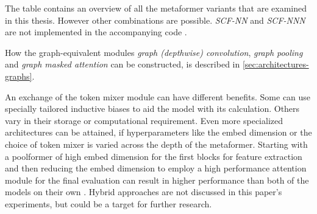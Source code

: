 The table contains an overview of all the metaformer variants that are examined in this thesis.
However other combinations are possible. \emph{SCF-NN} and \emph{SCF-NNN} are not implemented in the accompanying code \cite{selfPhysics}\cite{selfComputerScience}.

How the graph-equivalent modules \emph{graph (depthwise) convolution}, \emph{graph pooling} and \emph{graph masked attention} can be constructed, is described in \autoref{sec:architectures-graphs}.

An exchange of the token mixer module can have different benefits. 
Some can use specially tailored inductive biases to aid the model with its calculation.
Others vary in their storage or computational requirement.
Even more specialized architectures can be attained, if hyperparameters like the embed dimension or the choice of token mixer is varied across the depth of the metaformer. 
Starting with a poolformer of high embed dimension for the first blocks for feature extraction and then reducing the embed dimension to employ a high performance attention module for the final evaluation can result in higher performance than both of the models on their own \cite{metaformerPaper}. 
Hybrid approaches are not discussed in this paper's experiments, but could be a target for further research.
